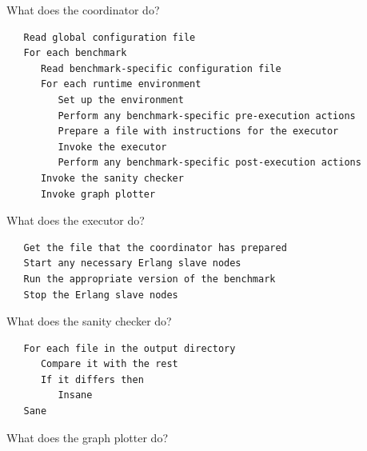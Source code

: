 \documentclass{beamer}
\begin{document}
\begin{frame}[fragile]{What does the coordinator do?}
	\begin{verbatim}
   Read global configuration file
   For each benchmark 
      Read benchmark-specific configuration file
      For each runtime environment
         Set up the environment
         Perform any benchmark-specific pre-execution actions
         Prepare a file with instructions for the executor
         Invoke the executor
         Perform any benchmark-specific post-execution actions
      Invoke the sanity checker
      Invoke graph plotter  
	\end{verbatim}
\end{frame}

\begin{frame}{What does the executor do?}
	\begin{verbatim}
   Get the file that the coordinator has prepared
   Start any necessary Erlang slave nodes
   Run the appropriate version of the benchmark
   Stop the Erlang slave nodes
	\end{verbatim}
\end{frame}

\begin{frame}{What does the sanity checker do?}
	\begin{verbatim}
   For each file in the output directory
      Compare it with the rest
      If it differs then
         Insane
   Sane
	\end{verbatim}
\end{frame}

\begin{frame}{What does the graph plotter do?}
	\begin{verbatim}
	\end{verbatim}
\end{frame}

\begin{frame}
\end{frame}

\begin{frame}
\end{frame}

\begin{frame}
\end{frame}

\begin{frame}
\end{frame}

\begin{frame}
\end{frame}
\end{document}

